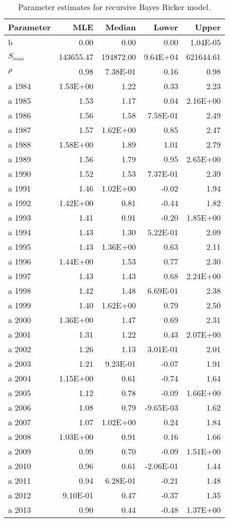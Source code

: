 \begin{table}[ht]
\centering
\caption{Parameter estimates for recursive Bayes Ricker model.} 
\begin{tabular}{lrrrr}
  \hline
Parameter & MLE & Median & Lower & Upper \\ 
  \hline
b & 0.00 & 0.00 & 0.00 & 1.04E-05 \\ 
  $S_{max}$ & 143655.47 & 194872.00 & 9.64E+04 & 621644.61 \\ 
  $\rho$ & 0.98 & 7.38E-01 & 0.16 & 0.98 \\ 
  a 1984 & 1.53E+00 & 1.22 & 0.33 & 2.23 \\ 
  a 1985 & 1.53 & 1.17 & 0.04 & 2.16E+00 \\ 
  a 1986 & 1.56 & 1.58 & 7.58E-01 & 2.49 \\ 
  a 1987 & 1.57 & 1.62E+00 & 0.85 & 2.47 \\ 
  a 1988 & 1.58E+00 & 1.89 & 1.01 & 2.79 \\ 
  a 1989 & 1.56 & 1.79 & 0.95 & 2.65E+00 \\ 
  a 1990 & 1.52 & 1.53 & 7.37E-01 & 2.39 \\ 
  a 1991 & 1.46 & 1.02E+00 & -0.02 & 1.94 \\ 
  a 1992 & 1.42E+00 & 0.81 & -0.44 & 1.82 \\ 
  a 1993 & 1.41 & 0.91 & -0.20 & 1.85E+00 \\ 
  a 1994 & 1.43 & 1.30 & 5.22E-01 & 2.09 \\ 
  a 1995 & 1.43 & 1.36E+00 & 0.63 & 2.11 \\ 
  a 1996 & 1.44E+00 & 1.53 & 0.77 & 2.30 \\ 
  a 1997 & 1.43 & 1.43 & 0.68 & 2.24E+00 \\ 
  a 1998 & 1.42 & 1.48 & 6.69E-01 & 2.38 \\ 
  a 1999 & 1.40 & 1.62E+00 & 0.79 & 2.50 \\ 
  a 2000 & 1.36E+00 & 1.47 & 0.69 & 2.31 \\ 
  a 2001 & 1.31 & 1.22 & 0.43 & 2.07E+00 \\ 
  a 2002 & 1.26 & 1.13 & 3.01E-01 & 2.01 \\ 
  a 2003 & 1.21 & 9.23E-01 & -0.07 & 1.91 \\ 
  a 2004 & 1.15E+00 & 0.61 & -0.74 & 1.64 \\ 
  a 2005 & 1.12 & 0.78 & -0.09 & 1.66E+00 \\ 
  a 2006 & 1.08 & 0.79 & -9.65E-03 & 1.62 \\ 
  a 2007 & 1.07 & 1.02E+00 & 0.24 & 1.84 \\ 
  a 2008 & 1.03E+00 & 0.91 & 0.16 & 1.66 \\ 
  a 2009 & 0.99 & 0.70 & -0.09 & 1.51E+00 \\ 
  a 2010 & 0.96 & 0.61 & -2.06E-01 & 1.44 \\ 
  a 2011 & 0.94 & 6.28E-01 & -0.21 & 1.48 \\ 
  a 2012 & 9.10E-01 & 0.47 & -0.37 & 1.35 \\ 
  a 2013 & 0.90 & 0.44 & -0.48 & 1.37E+00 \\ 
   \hline
\end{tabular}
\end{table}
